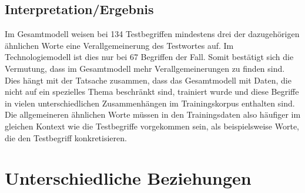 \documentclass[12pt,a4paper]{report}
\begin{document}
  
		\subsection*{Interpretation/Ergebnis}
		Im Gesamtmodell weisen bei 134 Testbegriffen mindestens drei der dazugehörigen ähnlichen Worte eine Verallgemeinerung des Testwortes auf. Im Technologiemodell ist dies nur bei 67 Begriffen der Fall. Somit bestätigt sich die Vermutung, dass im Gesamtmodell mehr Verallgemeinerungen zu finden sind. Dies hängt mit der Tatsache zusammen, dass das Gesamtmodell mit Daten, die nicht auf ein spezielles Thema beschränkt sind, trainiert wurde und diese Begriffe in vielen unterschiedlichen Zusammenhängen im Trainingskorpus enthalten sind. Die allgemeineren ähnlichen Worte müssen in den Trainingsdaten also häufiger im gleichen Kontext wie die Testbegriffe vorgekommen sein, als beispielsweise Worte, die den Testbegriff konkretisieren.\\
		
		
		
		
	
	\section{Unterschiedliche Beziehungen}
\end{document}
